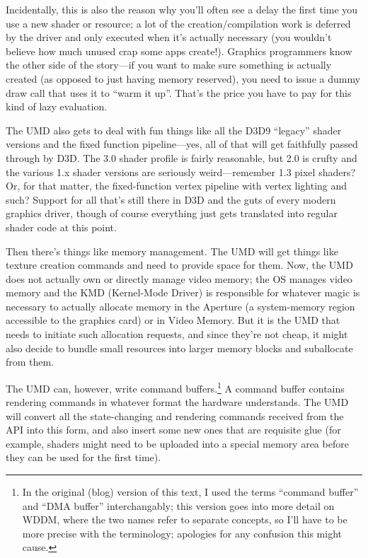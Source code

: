 Incidentally, this is also the reason why you'll often see a delay the first
time you use a new shader or resource; a lot of the creation/compilation work
is deferred by the driver and only executed when it's actually necessary (you
wouldn't believe how much unused crap some apps create!). Graphics programmers
know the other side of the story---if you want to make sure something is
actually created (as opposed to just having memory reserved), you need to issue
a dummy draw call that uses it to ``warm it up''. That's the price you have to 
pay for this kind of lazy evaluation.

The UMD also gets to deal with fun things like all the D3D9 ``legacy'' shader 
versions and the fixed function pipeline---yes, all of that
will get faithfully passed through by D3D. The 3.0 shader profile is fairly 
reasonable,  but 2.0 is crufty and the various 1.x
shader versions are seriously weird---remember 1.3 pixel shaders? Or, for that
matter, the fixed-function vertex pipeline with vertex lighting and such?  
Support for all that's still there in D3D and the guts of every modern graphics
driver, though of course everything just gets translated into regular shader 
code at this point.

Then there's things like memory management. The UMD will get things like
texture creation commands and need to provide space for them. Now, the UMD does 
not actually own or directly manage video memory; the OS manages video memory 
and the KMD (Kernel-Mode Driver) is responsible for whatever magic is necessary 
to actually allocate memory in the Aperture (a system-memory region accessible 
to the graphics card) or in Video Memory. But it is the UMD that needs to 
initiate such allocation requests, and since they're not cheap, it might also 
decide to bundle small resources into larger memory blocks and suballocate from 
them.

The UMD can, however, write command buffers.\footnote{In the original (blog)
version of this text, I used the terms ``command buffer'' and ``DMA buffer''
interchangably; this version goes into more detail on WDDM, where the two names 
refer to separate concepts, so I'll have to be more precise with the 
terminology; apologies for any confusion this might cause.} A command buffer 
contains rendering commands in whatever format the hardware understands. The 
UMD will convert all the state-changing and rendering commands received from 
the API into this form, and also insert some new ones that are requisite glue 
(for example, shaders might need to be uploaded into a special memory area 
before they can be used for the first time).

